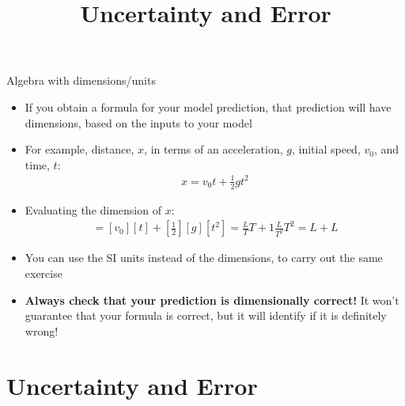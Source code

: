 \documentclass[aspectratio=169,
hyperref={colorlinks,urlcolor=blue}
]{beamer}
\begin{document}
\begin{frame}{Algebra with dimensions/units}
\begin{itemize}
\item If you obtain a formula for your model prediction, that prediction will have dimensions, based on the inputs to your model
\item For example, distance, $x$, in terms of an acceleration, $g$, initial speed, $v_0$, and time, $t$:
\begin{eqnarray}
x=v_0t+\frac{1}{2}gt^2
\end{eqnarray}
\item Evaluating the dimension of $x$:
\begin{eqnarray}
[x] = [v_0][t]+\left[\frac{1}{2}\right][g][t^2]=\frac{L}{T}T+1\frac{L}{T^2}T^2=L+L
\end{eqnarray}
\item You can use the SI units instead of the dimensions, to carry out the same exercise
\item \textbf{Always check that your prediction is dimensionally correct!} It won’t guarantee that your formula is correct, but it will identify if it is definitely wrong!
\end{itemize}

\end{frame}













\section{Uncertainty and Error}
\label{sec:uncertaintyanderror}
\title{Uncertainty and Error}
\author{\insertsubsection}


\begin{frame}
\titlepage
\thispagestyle{empty}
\end{frame}









\end{document}

